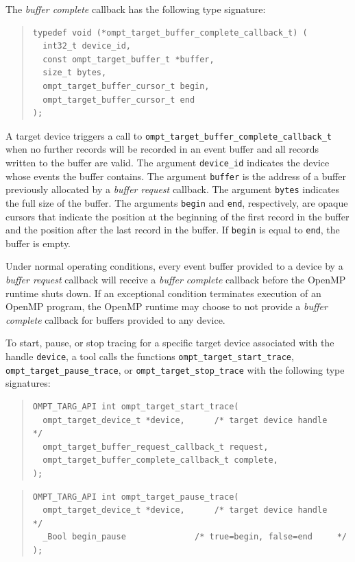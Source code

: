 \documentclass{article}
\begin{document}
The \emph{buffer complete} callback has the following type signature: 
\begin{quote}
\begin{verbatim}
typedef void (*ompt_target_buffer_complete_callback_t) (
  int32_t device_id, 
  const ompt_target_buffer_t *buffer,
  size_t bytes,
  ompt_target_buffer_cursor_t begin,
  ompt_target_buffer_cursor_t end
);
\end{verbatim}
\end{quote}
A target device triggers a call to \verb|ompt_target_buffer_complete_callback_t| when no further records will be recorded in an event buffer and all records written to the buffer are valid. 
The argument \verb|device_id| indicates the device whose events the buffer contains. The argument \verb|buffer| is the address of a buffer previously allocated by a \emph{buffer request} callback. The argument \verb|bytes| indicates the full size of the buffer. The arguments \verb|begin| and \verb|end|, respectively, are opaque cursors that indicate the position at the beginning of the first record in the buffer and the position after the last record in the buffer. If \verb|begin| is equal to \verb|end|, the buffer is empty. 

Under normal operating conditions, every event buffer provided to a device by a \emph{buffer request} callback will receive a \emph{buffer complete} callback before the OpenMP runtime shuts down. If an exceptional condition terminates  execution of an OpenMP program, the OpenMP runtime may choose to not provide a \emph{buffer complete} callback for buffers provided to any device.

To start, pause, or stop tracing for a specific target device associated with the handle \verb|device|, 
a tool calls the functions \verb|ompt_target_start_trace|, \verb|ompt_target_pause_trace|, or \verb|ompt_target_stop_trace| with the following type signatures:
\begin{quote}
\begin{verbatim}
OMPT_TARG_API int ompt_target_start_trace(
  ompt_target_device_t *device,      /* target device handle      */
  ompt_target_buffer_request_callback_t request,
  ompt_target_buffer_complete_callback_t complete,
);
\end{verbatim}
\end{quote}

\begin{quote}
\begin{verbatim}
OMPT_TARG_API int ompt_target_pause_trace(
  ompt_target_device_t *device,      /* target device handle      */
  _Bool begin_pause              /* true=begin, false=end     */
);
\end{verbatim}
\end{quote}
\end{document}
